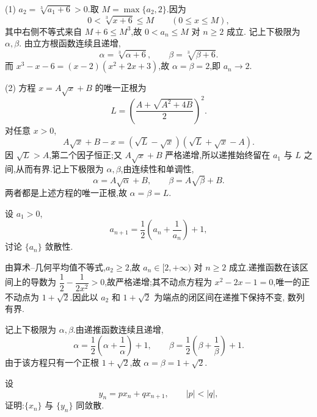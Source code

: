 \begin{solution}

  (1) $a_2=\sqrt[3]{a_1+6}>0$.取 $M=\max\{a_2,2\}$.因为
  \[
    0<\sqrt[3]{x+6}\leq M\qquad(0\leq x\leq M),
  \]
  其中右侧不等式来自 $M+6\leq M^3$,故 $0<a_n\leq M$ 对 $n\geq2$ 成立.
  记上下极限为 $\alpha,\beta$.
  由立方根函数连续且递增,
  \[
    \alpha=\sqrt[3]{\alpha+6},
    \qquad
    \beta=\sqrt[3]{\beta+6}.
  \]
  而 $x^3-x-6=(x-2)(x^2+2x+3)$,故 $\alpha=\beta=2$,即 $a_n\to2$.

  (2) 方程 $x=A\sqrt x+B$ 的唯一正根为
  \[
    L=\left(\dfrac{A+\sqrt{A^2+4B}}{2}\right)^2.
  \]
  对任意 $x>0$,
  \[
    A\sqrt x+B-x
    =(\sqrt L-\sqrt x)(\sqrt L+\sqrt x-A).
  \]
  因 $\sqrt L>A$,第二个因子恒正;又 $A\sqrt x+B$ 严格递增,所以递推始终留在
  $a_1$ 与 $L$ 之间,从而有界.记上下极限为 $\alpha,\beta$,由连续性和单调性,
  \[
    \alpha=A\sqrt\alpha+B,
    \qquad
    \beta=A\sqrt\beta+B.
  \]
  两者都是上述方程的唯一正根,故 $\alpha=\beta=L$.
\end{solution}

\begin{example}
  设 $a_1>0$,
  \[
    a_{n+1}=\dfrac{1}{2}\left(a_n+\dfrac{1}{a_n}\right)+1,
  \]
  讨论 $\{a_n\}$ 敛散性.
\end{example}
\exampleblank

\begin{solution}
  由算术--几何平均值不等式,$a_2\geq2$,故 $a_n\in\lbrack2,+\infty)$ 对
  $n\geq2$ 成立.递推函数在该区间上的导数为
  $\dfrac{1}{2}-\dfrac{1}{2x^2}>0$,故严格递增;其不动点方程为
  $x^2-2x-1=0$,唯一的正不动点为
  $1+\sqrt2$.因此以 $a_2$ 和 $1+\sqrt2$ 为端点的闭区间在递推下保持不变,
  数列有界.

  记上下极限为 $\alpha,\beta$.由递推函数连续且递增,
  \[
    \alpha=\dfrac{1}{2}\left(\alpha+\dfrac{1}{\alpha}\right)+1,
    \qquad
    \beta=\dfrac{1}{2}\left(\beta+\dfrac{1}{\beta}\right)+1.
  \]
  由于该方程只有一个正根 $1+\sqrt2$,故 $\alpha=\beta=1+\sqrt2$.
\end{solution}

\begin{example}
  设
  \[
    y_n=px_n+qx_{n+1},
    \qquad |p|<|q|,
  \]
  证明:$\{x_n\}$ 与 $\{y_n\}$ 同敛散.
\end{example}
\exampleblank

